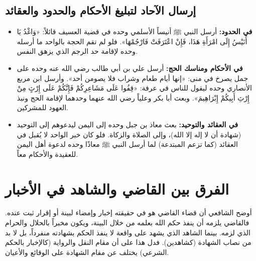 \subsection{إرسال الآحاد لتبليغ الأحكام والحدود والعقائد}
\begin{itemize}
    \item \textbf{في الحدود:} أرسل النبي ﷺ أنيساً الأسلمي وحده في قضية العسيف قائلاً: «وَاغْدُ يَا أُنَيْسُ إِلَى امْرَأَةِ هَذَا، فَإِنْ اعْتَرَفَتْ فَارْجُمْهَا». فلو لم تقم الحجة بالواحد ما أرسله وحده لإقامة حد الرجم الذي يزهق النفس.
    \item \textbf{في الأحكام ومناسك الحج:} أرسل علي بن أبي طالب رضي الله عنه وحده على جمل يصرخ في منى: «إنها أيام طعام وشراب فلا يصومن أحد». وأرسل ابن مربع الأنصاري وحده ليقول للناس في عرفة: «قِفُوا عَلَى مَشَاعِرِكُمْ فَإِنَّكُمْ عَلَى إِرْثٍ مِنْ إِرْثِ أَبِيكُمْ إِبْرَاهِيمَ». وبعث أبا بكر وعلياً رضي الله عنهما وحدهما لإقامة الحج ونبذ العهود للمشركين.
    \item \textbf{في العقائد والتوحيد:} بعث معاذ بن جبل وحده إلى اليمن ليدعوهم إلى التوحيد (شهادة أن لا إله إلا الله)، وإلى الصلاة والزكاة. فلو كان خبر الواحد لا يُقبل في العقائد (كما تزعم المبتدعة) لما أرسل النبي ﷺ معاذًا وحده لدعوة أهل اليمن للعقيدة والأحكام معاً.
\end{itemize}

\section{الفرق بين القاضي والشاهد في الأخبار}
أوضح الشافعي أن قضاء القاضي هو في حقيقته إخبار وإمضاء لبينة أو إقرار ثبت عنده. فالقاضي يلزمه أن ينفذ حكم الله بعلمه من خلال البينة، ويكون مخبراً بالحلال والحرام الذي لزمه. بينما الشاهد الذي يشهد على واقعة لا ينفذ الحكم بشهادته منفرداً، بل لا بد من نصاب الشهادة (كشاهدين). فدل هذا على أن مقام النقل والرواية (كالإخبار بالحكم الشرعي) يختلف عن مقام الشهادة على الوقائع والأعيان.